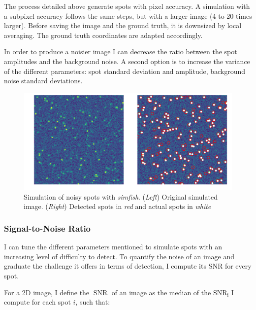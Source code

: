 
The process detailed above generate spots with pixel accuracy.
A simulation with a subpixel accuracy follows the same steps, but with a larger image (4 to 20 times larger).
Before saving the image and the ground truth, it is downsized by local averaging.
The ground truth coordinates are adapted accordingly.

In order to produce a noisier image I can decrease the ratio between the spot amplitudes and the background noise.
A second option is to increase the variance of the different parameters: spot standard deviation and amplitude, background noise standard deviations.

\begin{figure}[]
    \centering
    \includegraphics[width=1\textwidth]{figures/chapter2/plot_spot_detection}
    \caption[Simulation of noisy spots with \emph{simfish}]{Simulation of noisy spots with \emph{simfish}.
	(\textit{Left}) Original simulated image.
	(\textit{Right}) Detected spots in \textit{red} and actual spots in \textit{white}}
    \label{fig:spot_detection_high_noise}
\end{figure}

\subsubsection{Signal-to-Noise Ratio}

I can tune the different parameters mentioned to simulate spots with an increasing level of difficulty to detect.
To quantify the noise of an image and graduate the challenge it offers in terms of detection, I compute its \ac{SNR} for every spot.

\noindent
For a 2D image, I define the $\operatorname{SNR}$ of an image as the median of the $\operatorname{SNR_i}$ I compute for each spot $i$, such that:

